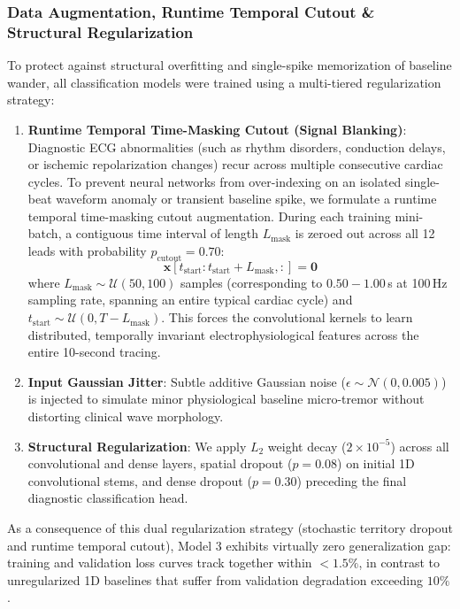\documentclass[12pt]{elsarticle}
\begin{document}
\subsubsection{Data Augmentation, Runtime Temporal Cutout \& Structural Regularization}
\label{sec:cutout_regularization}
To protect against structural overfitting and single-spike memorization of baseline wander, all classification models were trained using a multi-tiered regularization strategy:
\begin{enumerate}
    \item \textbf{Runtime Temporal Time-Masking Cutout (Signal Blanking)}: Diagnostic ECG abnormalities (such as rhythm disorders, conduction delays, or ischemic repolarization changes) recur across multiple consecutive cardiac cycles. To prevent neural networks from over-indexing on an isolated single-beat waveform anomaly or transient baseline spike, we formulate a runtime temporal time-masking cutout augmentation. During each training mini-batch, a contiguous time interval of length $L_{\text{mask}}$ is zeroed out across all 12 leads with probability $p_{\text{cutout}} = 0.70$:
    \begin{equation}
    \mathbf{x}[t_{\text{start}} : t_{\text{start}} + L_{\text{mask}}, :] = \mathbf{0}
    \end{equation}
    where $L_{\text{mask}} \sim \mathcal{U}(50, 100)$ samples (corresponding to $0.50 - 1.00$\,s at 100\,Hz sampling rate, spanning an entire typical cardiac cycle) and $t_{\text{start}} \sim \mathcal{U}(0, T - L_{\text{mask}})$. This forces the convolutional kernels to learn distributed, temporally invariant electrophysiological features across the entire 10-second tracing.
    \item \textbf{Input Gaussian Jitter}: Subtle additive Gaussian noise ($\epsilon \sim \mathcal{N}(0, 0.005)$) is injected to simulate minor physiological baseline micro-tremor without distorting clinical wave morphology.
    \item \textbf{Structural Regularization}: We apply $L_2$ weight decay ($2 \times 10^{-5}$) across all convolutional and dense layers, spatial dropout ($p = 0.08$) on initial 1D convolutional stems, and dense dropout ($p = 0.30$) preceding the final diagnostic classification head.
\end{enumerate}
As a consequence of this dual regularization strategy (stochastic territory dropout and runtime temporal cutout), Model 3 exhibits virtually zero generalization gap: training and validation loss curves track together within $<1.5\%$, in contrast to unregularized 1D baselines that suffer from validation degradation exceeding $10\%$.
\end{document}
